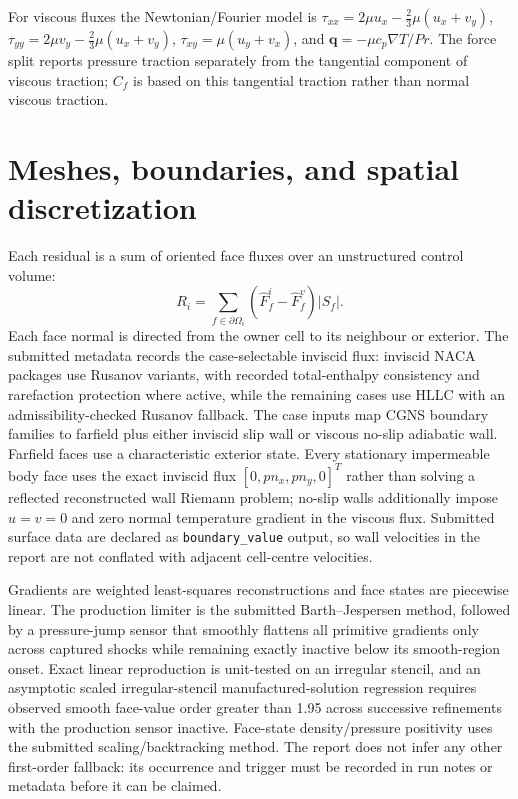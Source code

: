 \documentclass[11pt]{article}
\begin{document}
For viscous fluxes the Newtonian/Fourier model is $\tau_{xx}=2\mu u_x-\tfrac23\mu(u_x+v_y)$, $\tau_{yy}=2\mu v_y-\tfrac23\mu(u_x+v_y)$, $\tau_{xy}=\mu(u_y+v_x)$, and $\mathbf q=-\mu c_p\nabla T/Pr$.  The force split reports pressure traction separately from the tangential component of viscous traction; $C_f$ is based on this tangential traction rather than normal viscous traction.
\section{Meshes, boundaries, and spatial discretization}
Each residual is a sum of oriented face fluxes over an unstructured control volume:
\[
R_i=\sum_{f\in\partial\Omega_i}(\widehat{F}^i_f-\widehat{F}^v_f)|S_f|.
\]
Each face normal is directed from the owner cell to its neighbour or exterior.  The submitted metadata records the case-selectable inviscid flux: inviscid NACA packages use Rusanov variants, with recorded total-enthalpy consistency and rarefaction protection where active, while the remaining cases use HLLC with an admissibility-checked Rusanov fallback.  The case inputs map CGNS boundary families to farfield plus either inviscid slip wall or viscous no-slip adiabatic wall.  Farfield faces use a characteristic exterior state.  Every stationary impermeable body face uses the exact inviscid flux $[0,pn_x,pn_y,0]^T$ rather than solving a reflected reconstructed wall Riemann problem; no-slip walls additionally impose $u=v=0$ and zero normal temperature gradient in the viscous flux.  Submitted surface data are declared as \texttt{boundary\_value} output, so wall velocities in the report are not conflated with adjacent cell-centre velocities.

Gradients are weighted least-squares reconstructions and face states are piecewise linear.  The production limiter is the submitted Barth--Jespersen method, followed by a pressure-jump sensor that smoothly flattens all primitive gradients only across captured shocks while remaining exactly inactive below its smooth-region onset.  Exact linear reproduction is unit-tested on an irregular stencil, and an asymptotic scaled irregular-stencil manufactured-solution regression requires observed smooth face-value order greater than 1.95 across successive refinements with the production sensor inactive.  Face-state density/pressure positivity uses the submitted scaling/backtracking method.  The report does not infer any other first-order fallback: its occurrence and trigger must be recorded in run notes or metadata before it can be claimed.
\end{document}
